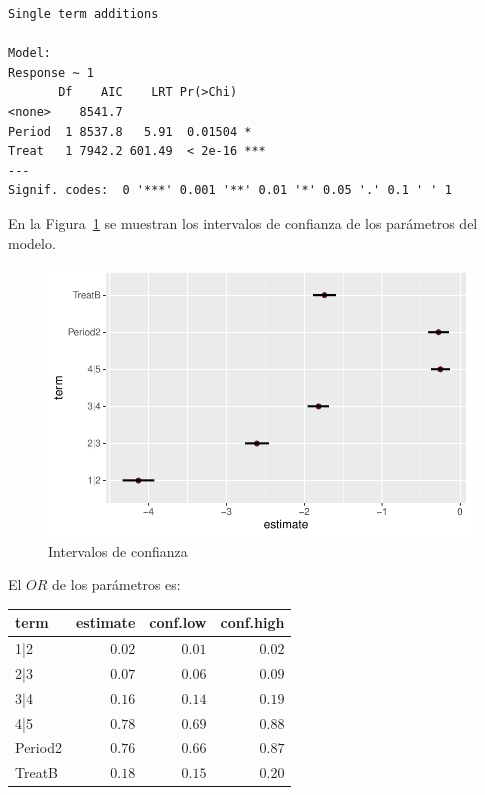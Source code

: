 \documentclass[
  letterpaper,
  DIV=11,
  numbers=noendperiod]{scrartcl}
\begin{document}
\begin{verbatim}
Single term additions

Model:
Response ~ 1
       Df    AIC    LRT Pr(>Chi)    
<none>    8541.7                    
Period  1 8537.8   5.91  0.01504 *  
Treat   1 7942.2 601.49  < 2e-16 ***
---
Signif. codes:  0 '***' 0.001 '**' 0.01 '*' 0.05 '.' 0.1 ' ' 1
\end{verbatim}

En la Figura~\ref{fig-clm_likert_period_treat-confint} se muestran los
intervalos de confianza de los parámetros del modelo.

\begin{figure}

{\centering \includegraphics{ordinal_files/figure-pdf/fig-clm_likert_period_treat-confint-1.pdf}

}

\caption{\label{fig-clm_likert_period_treat-confint}Intervalos de
confianza}

\end{figure}

El \(OR\) de los parámetros es:

\begin{longtable}{lrrr}
\toprule
term & estimate & conf.low & conf.high \\ 
\midrule
1|2 & $0.02$ & $0.01$ & $0.02$ \\ 
2|3 & $0.07$ & $0.06$ & $0.09$ \\ 
3|4 & $0.16$ & $0.14$ & $0.19$ \\ 
4|5 & $0.78$ & $0.69$ & $0.88$ \\ 
Period2 & $0.76$ & $0.66$ & $0.87$ \\ 
TreatB & $0.18$ & $0.15$ & $0.20$ \\ 
\bottomrule
\end{longtable}
\end{document}
